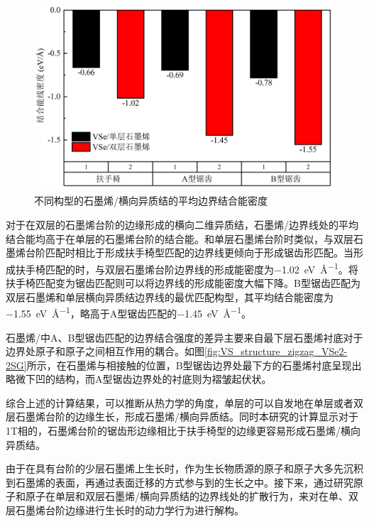     \begin{figure}[htb]
        \includegraphics{pic/VS_DFT_VSe2-G_stepAndEdge.png}
        \caption{不同构型的石墨烯/横向异质结的平均边界结合能密度}
        \label{fig:VS_DFT_VSe2-G_stepAndEdge}
    \end{figure}

    对于在双层的石墨烯台阶的边缘形成的横向二维异质结，石墨烯/边界线处的平均结合能均高于在单层的石墨烯台阶的结合能。和单层石墨烯台阶时类似，与双层石墨烯台阶匹配时相比于形成扶手椅型匹配的边界线更倾向于形成锯齿形匹配。当形成扶手椅匹配的时，与双层石墨烯台阶边界线的形成能密度为\SI{-1.02}{\electronvolt\per\angstrom}。将扶手椅匹配变为锯齿匹配则可以将边界线的形成能密度大幅下降。B型锯齿匹配为双层石墨烯和单层横向异质结边界线的最优匹配构型，其平均结合能密度为\SI{-1.55}{\electronvolt\per\angstrom}，略高于A型锯齿匹配的\SI{-1.45}{\electronvolt\per\angstrom}。

    石墨烯/中A、B型锯齿匹配的边界结合强度的差异主要来自最下层石墨烯衬底对于边界处原子和原子之间相互作用的耦合。如图\ref{fig:VS_structure_zigzag_VSe2-2SG}所示，在石墨烯与相接触的位置，B型锯齿边界处最下方的石墨烯衬底呈现出略微下凹的结构，而A型锯齿边界处的衬底则为褶皱起伏状。

    综合上述的计算结果，可以推断从热力学的角度，单层的可以自发地在单层或者双层石墨烯台阶的边缘生长，形成石墨烯/横向异质结。同时本研究的计算显示对于1T相的，石墨烯台阶的锯齿形边缘相比于扶手椅型的边缘更容易形成石墨烯/横向异质结。

    由于在具有台阶的少层石墨烯上生长时，作为生长物质源的原子和原子大多先沉积到石墨烯的表面，再通过表面迁移的方式参与到的生长之中。接下来，通过研究原子和原子在单层和双层石墨烯/横向异质结的边界线处的扩散行为，来对在单、双层石墨烯台阶边缘进行生长时的动力学行为进行解构。

